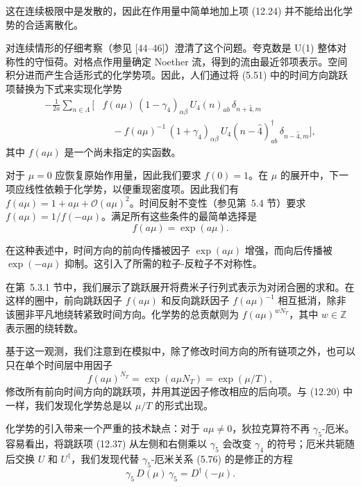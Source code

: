 这在连续极限中是发散的，因此在作用量中简单地加上项 (12.24) 并不能给出化学势的合适离散化。

对连续情形的仔细考察（参见 [44--46]）澄清了这个问题。夸克数是 U(1) 整体对称性的守恒荷。对格点作用量确定 Noether 流，得到的流由最近邻项表示。空间积分进而产生合适形式的化学势项。因此，人们通过将 (5.51) 中的时间方向跳跃项替换为下式来实现化学势
\begin{equation}
\begin{split}
  -\frac{1}{2a}\sum_{n\in\Lambda}\Big[
  &f(a\mu)\,(1-\gamma_4)_{\alpha\beta}\,U_4(n)_{ab}\,\delta_{n+\hat{4},m}\\
  &\quad - f(a\mu)^{-1}\,(1+\gamma_4)_{\alpha\beta}\,
    U_4(n-\hat{4})^\dagger_{ab}\,\delta_{n-\hat{4},m}
  \Big],
\end{split}
\end{equation}
其中 $f(a\mu)$ 是一个尚未指定的实函数。

对于 $\mu = 0$ 应恢复原始作用量，因此我们要求 $f(0) = 1$。在 $\mu$ 的展开中，下一项应线性依赖于化学势，以便重现密度项。因此我们有 $f(a\mu) = 1 + a\mu + \mathcal{O}(a\mu)^2$。时间反射不变性（参见第~5.4 节）要求 $f(a\mu) = 1/f(-a\mu)$。满足所有这些条件的最简单选择是
\begin{equation}
  f(a\mu) = \exp(a\mu).
\end{equation}

在这种表述中，时间方向的前向传播被因子 $\exp(a\mu)$ 增强，而向后传播被 $\exp(-a\mu)$ 抑制。这引入了所需的粒子-反粒子不对称性。

在第~5.3.1 节中，我们展示了跳跃展开将费米子行列式表示为对闭合圈的求和。在这样的圈中，前向跳跃因子 $f(a\mu)$ 和反向跳跃因子 $f(a\mu)^{-1}$ 相互抵消，除非该圈非平凡地绕转紧致时间方向。化学势的总贡献则为 $f(a\mu)^{wN_T}$，其中 $w \in \mathbb{Z}$ 表示圈的绕转数。

基于这一观测，我们注意到在模拟中，除了修改时间方向的所有链项之外，也可以只在单个时间层中用因子
\begin{equation}
  f(a\mu)^{N_T} = \exp(a\mu N_T) = \exp(\mu/T),
\end{equation}
修改所有前向时间方向的跳跃项，并用其逆因子修改相应的后向项。与 (12.20) 中一样，我们发现化学势总是以 $\mu/T$ 的形式出现。

化学势的引入带来一个严重的技术缺点：对于 $a\mu \ne 0$，狄拉克算符不再 $\gamma_5$-厄米。容易看出，将跳跃项 (12.37) 从左侧和右侧乘以 $\gamma_5$ 会改变 $\gamma_4$ 的符号；厄米共轭随后交换 $U$ 和 $U^\dagger$，我们发现代替 $\gamma_5$-厄米关系 (5.76) 的是修正的方程
\begin{equation}
  \gamma_5\,D(\mu)\,\gamma_5 = D^\dagger(-\mu).
\end{equation}

